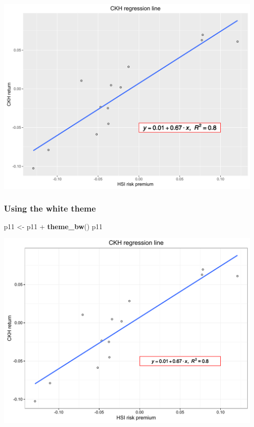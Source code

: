 \documentclass[]{article}
\newenvironment{Shaded}{\begin{snugshade}}{\end{snugshade}}
\newcommand{\KeywordTok}[1]{\textcolor[rgb]{0.13,0.29,0.53}{\textbf{{#1}}}}
\newcommand{\StringTok}[1]{\textcolor[rgb]{0.31,0.60,0.02}{{#1}}}
\newcommand{\NormalTok}[1]{{#1}}
\begin{document}
\begin{center}\includegraphics{0_all_posts_pdf/lr_13-1} \end{center}

\subsubsection{Using the white theme}\label{using-the-white-theme-10}

\begin{Shaded}
\begin{Highlighting}[]
\NormalTok{p11 <-}\StringTok{ }\NormalTok{p11 +}\StringTok{ }\KeywordTok{theme_bw}\NormalTok{()}
\NormalTok{p11}
\end{Highlighting}
\end{Shaded}

\begin{center}\includegraphics{0_all_posts_pdf/lr_14-1} \end{center}
\end{document}
